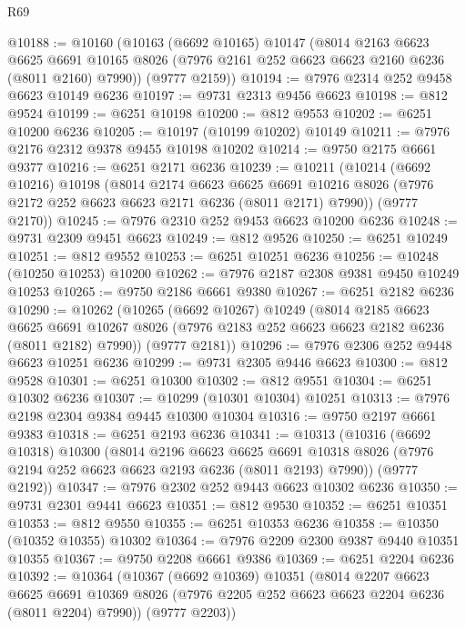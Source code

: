 \begin{lexlean}{R69}
\begin{coremodule}
{@10188 := @10160
    (@10163
      (@6692 @10165)
      @10147
      (@8014
        @2163
        @6623
        @6625
        @6691
        @10165
        @8026
        (@7976 @2161 @252 @6623 @6623 @2160 @6236 (@8011 @2160) @7990))
      (@9777 @2159))
@10194 := @7976 @2314 @252 @9458 @6623 @10149 @6236
@10197 := @9731 @2313 @9456 @6623
@10198 := @812 @9524
@10199 := @6251 @10198
@10200 := @812 @9553
@10202 := @6251 @10200 @6236
@10205 := @10197 (@10199 @10202) @10149
@10211 := @7976 @2176 @2312 @9378 @9455 @10198 @10202
@10214 := @9750 @2175 @6661 @9377
@10216 := @6251 @2171 @6236
@10239 := @10211
    (@10214
      (@6692 @10216)
      @10198
      (@8014
        @2174
        @6623
        @6625
        @6691
        @10216
        @8026
        (@7976 @2172 @252 @6623 @6623 @2171 @6236 (@8011 @2171) @7990))
      (@9777 @2170))
@10245 := @7976 @2310 @252 @9453 @6623 @10200 @6236
@10248 := @9731 @2309 @9451 @6623
@10249 := @812 @9526
@10250 := @6251 @10249
@10251 := @812 @9552
@10253 := @6251 @10251 @6236
@10256 := @10248 (@10250 @10253) @10200
@10262 := @7976 @2187 @2308 @9381 @9450 @10249 @10253
@10265 := @9750 @2186 @6661 @9380
@10267 := @6251 @2182 @6236
@10290 := @10262
    (@10265
      (@6692 @10267)
      @10249
      (@8014
        @2185
        @6623
        @6625
        @6691
        @10267
        @8026
        (@7976 @2183 @252 @6623 @6623 @2182 @6236 (@8011 @2182) @7990))
      (@9777 @2181))
@10296 := @7976 @2306 @252 @9448 @6623 @10251 @6236
@10299 := @9731 @2305 @9446 @6623
@10300 := @812 @9528
@10301 := @6251 @10300
@10302 := @812 @9551
@10304 := @6251 @10302 @6236
@10307 := @10299 (@10301 @10304) @10251
@10313 := @7976 @2198 @2304 @9384 @9445 @10300 @10304
@10316 := @9750 @2197 @6661 @9383
@10318 := @6251 @2193 @6236
@10341 := @10313
    (@10316
      (@6692 @10318)
      @10300
      (@8014
        @2196
        @6623
        @6625
        @6691
        @10318
        @8026
        (@7976 @2194 @252 @6623 @6623 @2193 @6236 (@8011 @2193) @7990))
      (@9777 @2192))
@10347 := @7976 @2302 @252 @9443 @6623 @10302 @6236
@10350 := @9731 @2301 @9441 @6623
@10351 := @812 @9530
@10352 := @6251 @10351
@10353 := @812 @9550
@10355 := @6251 @10353 @6236
@10358 := @10350 (@10352 @10355) @10302
@10364 := @7976 @2209 @2300 @9387 @9440 @10351 @10355
@10367 := @9750 @2208 @6661 @9386
@10369 := @6251 @2204 @6236
@10392 := @10364
    (@10367
      (@6692 @10369)
      @10351
      (@8014
        @2207
        @6623
        @6625
        @6691
        @10369
        @8026
        (@7976 @2205 @252 @6623 @6623 @2204 @6236 (@8011 @2204) @7990))
      (@9777 @2203))
}
\end{coremodule}
\end{lexlean}
